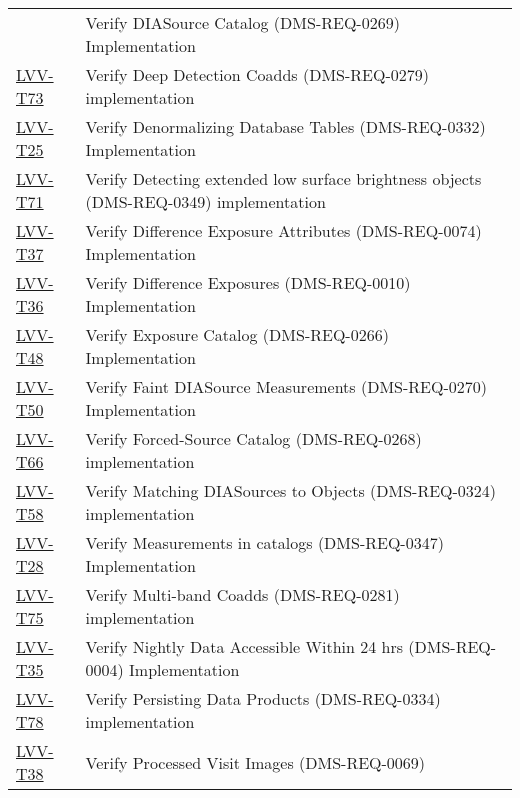 \begin{longtable}[]{@{}ll@{}}
& Verify DIASource Catalog (DMS-REQ-0269) Implementation\tabularnewline
\protect\hyperlink{lvv-t73---verify-deep-detection-coadds-dms-req-0279-implementation}{LVV-T73}
& Verify Deep Detection Coadds (DMS-REQ-0279)
implementation\tabularnewline
\protect\hyperlink{lvv-t25---verify-denormalizing-database-tables-dms-req-0332-implementation}{LVV-T25}
& Verify Denormalizing Database Tables (DMS-REQ-0332)
Implementation\tabularnewline
\protect\hyperlink{lvv-t71---verify-detecting-extended--low-surface-brightness-objects-dms-req-0349-implementation}{LVV-T71}
& Verify Detecting extended low surface brightness objects
(DMS-REQ-0349) implementation\tabularnewline
\protect\hyperlink{lvv-t37---verify-difference-exposure-attributes-dms-req-0074-implementation}{LVV-T37}
& Verify Difference Exposure Attributes (DMS-REQ-0074)
Implementation\tabularnewline
\protect\hyperlink{lvv-t36---verify-difference-exposures--dms-req-0010-implementation}{LVV-T36}
& Verify Difference Exposures (DMS-REQ-0010)
Implementation\tabularnewline
\protect\hyperlink{lvv-t48---verify-exposure-catalog-dms-req-0266-implementation}{LVV-T48}
& Verify Exposure Catalog (DMS-REQ-0266) Implementation\tabularnewline
\protect\hyperlink{lvv-t50---verify-faint-diasource-measurements-dms-req-0270-implementation}{LVV-T50}
& Verify Faint DIASource Measurements (DMS-REQ-0270)
Implementation\tabularnewline
\protect\hyperlink{lvv-t66---verify-forced-source-catalog-dms-req-0268-implementation}{LVV-T66}
& Verify Forced-Source Catalog (DMS-REQ-0268)
implementation\tabularnewline
\protect\hyperlink{lvv-t58---verify-matching-diasources-to-objects-dms-req-0324-implementation}{LVV-T58}
& Verify Matching DIASources to Objects (DMS-REQ-0324)
implementation\tabularnewline
\protect\hyperlink{lvv-t28---verify-measurements-in-catalogs-dms-req-0347-implementation}{LVV-T28}
& Verify Measurements in catalogs (DMS-REQ-0347)
Implementation\tabularnewline
\protect\hyperlink{lvv-t75---verify-multi-band-coadds-dms-req-0281-implementation}{LVV-T75}
& Verify Multi-band Coadds (DMS-REQ-0281) implementation\tabularnewline
\protect\hyperlink{lvv-t35---verify-nightly-data-accessible-within-24-hrs-dms-req-0004-implementation}{LVV-T35}
& Verify Nightly Data Accessible Within 24 hrs (DMS-REQ-0004)
Implementation\tabularnewline
\protect\hyperlink{lvv-t78---verify-persisting-data-products-dms-req-0334-implementation}{LVV-T78}
& Verify Persisting Data Products (DMS-REQ-0334)
implementation\tabularnewline
\protect\hyperlink{lvv-t38---verify-processed-visit-images-dms-req-0069-implementation}{LVV-T38}
& Verify Processed Visit Images (DMS-REQ-0069)

\end{longtable}
